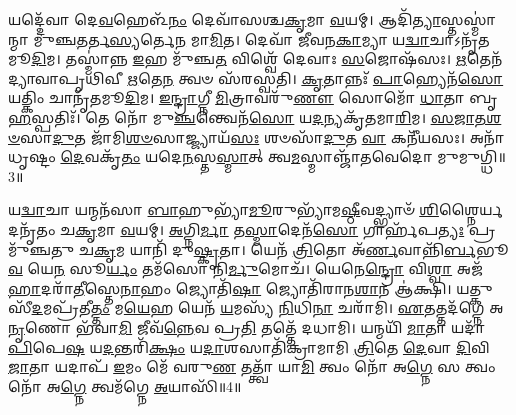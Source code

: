 𑌯𑌦𑍍𑌦𑍇᳴𑌵𑌾 𑌦𑍇\-\ul{𑌵}\-𑌹𑍇𑌳᳴\-\ul{𑌨𑌂} 𑌦𑍇𑌵𑌾᳴𑌸𑌶𑍍𑌚\-\ul{𑌕𑍃}\-𑌮𑌾 \ul{𑌵}\-𑌯𑌮𑍍। 
𑌆𑌦𑌿᳴\-\ul{𑌤𑍍𑌯𑌾}\-𑌸𑍍𑌤𑌸𑍍𑌮𑌾॑𑌨𑍍𑌮𑌾 𑌮𑍁𑌞𑍍𑌚\-\ul{𑌤}\-𑌰𑍍𑌤\-\ul{𑌸𑍍𑌯}\-𑌰𑍍𑌤𑍇\-\ul{𑌨} 𑌮𑌾\-\ul{𑌮𑌿}\-𑌤। 
𑌦𑍇𑌵𑌾᳴ 𑌜𑍀𑌵𑌨\-\ul{𑌕𑌾}\-𑌮𑍍𑌯𑌾 𑌯\-\ul{𑌦𑍍𑌵𑌾}\-𑌚𑌾𑌽𑌨𑍃᳴𑌤\-𑌮𑍂\-\ul{𑌦𑌿}\-𑌮। 
𑌤𑌸𑍍𑌮𑌾॑𑌨𑍍𑌨 \ul{𑌇}\-𑌹 𑌮𑍁᳴𑌞𑍍𑌚\-\ul{𑌤} 𑌵𑌿𑌶𑍍𑌵𑍇᳴ 𑌦𑍇𑌵𑌾𑌃 \ul{𑌸}\-𑌜𑍋𑌷᳴𑌸𑌃। 
\-\ul{𑌋}\-𑌤𑍇𑌨᳴ 𑌦𑍍𑌯𑌾𑌵𑌾𑌪𑍃𑌥𑌿𑌵𑍀 \ul{𑌋}\-𑌤𑍇\-\ul{𑌨} 𑌤𑍍𑌵𑍞 𑌸᳴𑌰𑌸𑍍𑌵𑌤𑌿। 
\-\ul{𑌕𑍃}\-𑌤𑌾𑌨𑍍𑌨𑌃᳴ \ul{𑌪𑌾}\-𑌹𑍍𑌯𑍇𑌨᳴\-\ul{𑌸𑍋} 𑌯𑌤𑍍𑌕𑌿𑌂 𑌚𑌾𑌨𑍃᳴𑌤\-𑌮𑍂\-\ul{𑌦𑌿}\-𑌮। 
\-\ul{𑌇}\-\-\ul{𑌨𑍍𑌦𑍍𑌰𑌾}\-𑌗𑍍𑌨𑍀 \ul{𑌮𑌿}\-𑌤𑍍𑌰𑌾𑌵𑌰𑍁᳴\-\ul{𑌣𑍗} 𑌸𑍋𑌮𑍋᳴ \ul{𑌧𑌾}\-𑌤𑌾 𑌬𑍃\-\ul{𑌹}\-𑌸𑍍𑌪𑌤𑌿𑌃᳴। 
𑌤𑍇 𑌨𑍋᳴ 𑌮𑍁\-\ul{𑌞𑍍𑌚}\-𑌨𑍍𑌤𑍍𑌵𑍇𑌨᳴\-\ul{𑌸𑍋} 𑌯\-\ul{𑌦}\-𑌨𑍍𑌯𑌕𑍃᳴𑌤𑌮𑌾\-\ul{𑌰𑌿}\-𑌮। 
\-\ul{𑌸}\-\-\ul{𑌜𑌾}\-\-\ul{𑌤}\-\-\ul{𑌶}\-\-\ul{𑍞}\-𑌸𑌾\-\ul{𑌦𑍁}\-𑌤 𑌜𑌾᳴𑌮𑌿\-\ul{𑌶}\-\-\ul{𑍞}\-𑌸𑌾𑌜𑍍𑌜𑍍𑌯𑌾𑌯᳴\-\ul{𑌸𑌃} 𑌶𑍞𑌸𑌾᳴\-\ul{𑌦𑍁}\-𑌤 \ul{𑌵𑌾} 𑌕𑌨𑍀᳴𑌯𑌸𑌃। 
𑌅𑌨𑌾᳴𑌧𑍃𑌷𑍍𑌟𑌂 \ul{𑌦𑍇}\-𑌵𑌕𑍃᳴\-\ul{𑌤𑌂} 𑌯𑌦𑍇\-\ul{𑌨}\-𑌸𑍍𑌤\-\ul{𑌸𑍍𑌮𑌾}\-𑌤𑍍 𑌤𑍍𑌵\-\ul{𑌮}\-𑌸𑍍𑌮𑌾𑌞𑍍𑌜𑌾᳴𑌤𑌵𑍇𑌦𑍋 𑌮𑍁𑌮𑍁𑌗𑍍𑌧𑌿॥3॥

𑌯\-\ul{𑌦𑍍𑌵𑌾}\-𑌚𑌾 𑌯𑌨𑍍𑌮𑌨᳴𑌸𑌾 \ul{𑌬𑌾}\-𑌹𑍁𑌭𑍍𑌯𑌾᳴\-\ul{𑌮𑍂}\-𑌰𑍁𑌭𑍍𑌯𑌾᳴𑌮\-\ul{𑌷𑍍𑌠𑍀}\-𑌵𑌦𑍍𑌭𑍍𑌯𑌾𑍞᳴ \ul{𑌶𑌿}\-𑌶𑍍𑌨𑍈𑌰𑍍𑌯𑌦𑌨𑍃᳴𑌤𑌂 𑌚\-\ul{𑌕𑍃}\-𑌮𑌾 \ul{𑌵}\-𑌯𑌮𑍍। 
\-\ul{𑌅}\-𑌗𑍍𑌨𑌿\-\ul{𑌰𑍍𑌮𑌾} 𑌤\-\ul{𑌸𑍍𑌮𑌾}\-𑌦𑍇𑌨᳴\-\ul{𑌸𑍋} 𑌗𑌾𑌰𑍍\mbox{}𑌹᳴𑌪\-\ul{𑌤𑍍𑌯𑌃} 𑌪𑍍𑌰𑌮𑍁᳴𑌞𑍍𑌚𑌤𑍁 𑌚\-\ul{𑌕𑍃}\-𑌮 𑌯𑌾𑌨𑌿᳴ 𑌦𑍁\-\ul{𑌷𑍍𑌕𑍃}\-𑌤𑌾। 
𑌯𑍇𑌨᳴ \ul{𑌤𑍍𑌰𑌿}\-𑌤𑍋 𑌅᳴\-\ul{𑌰𑍍𑌣}\-𑌵𑌾𑌨𑍍𑌨𑌿᳴\-\ul{𑌰𑍍𑌬}\-𑌭𑍂\-\ul{𑌵} 𑌯𑍇\-\ul{𑌨} 𑌸𑍂\-\ul{𑌰𑍍𑌯𑌂} 𑌤𑌮᳴𑌸𑍋 𑌨𑌿\-\ul{𑌰𑍍𑌮𑍁}\-𑌮𑍋𑌚᳴। 
𑌯𑍇𑌨𑍇\-\ul{𑌨𑍍𑌦𑍍𑌰𑍋} 𑌵𑌿\-\ul{𑌶𑍍𑌵𑌾} 𑌅𑌜᳴\-\ul{𑌹𑌾}\-𑌦𑌰𑌾᳴\-\ul{𑌤𑍀}\-𑌸𑍍𑌤𑍇\-\ul{𑌨𑌾}\-𑌹𑌂 𑌜𑍍𑌯𑍋𑌤𑌿᳴\-\ul{𑌷𑌾} 𑌜𑍍𑌯𑍋𑌤𑌿᳴𑌰𑌾𑌨\-\ul{𑌶𑌾}\-𑌨 𑌆॑𑌕𑍍𑌷𑌿। 
𑌯𑌤𑍍𑌕𑍁𑌸𑍀᳴\-\ul{𑌦}\-𑌮𑌪𑍍𑌰᳴𑌤𑍀\-\ul{𑌤𑍍𑌤𑌂} 𑌮\-\ul{𑌯𑍇}\-𑌹 𑌯𑍇𑌨᳴ \ul{𑌯}\-𑌮𑌸𑍍𑌯᳴ \ul{𑌨𑌿}\-𑌧𑌿\-\ul{𑌨𑌾} 𑌚𑌰𑌾᳴𑌮𑌿। 
\-\ul{𑌏}\-𑌤𑌤𑍍𑌤𑌦᳴𑌗𑍍𑌨𑍇 𑌅\-\ul{𑌨𑍃}\-𑌣𑍋 𑌭᳴𑌵𑌾\-\ul{𑌮𑌿} 𑌜𑍀𑌵᳴\-\ul{𑌨𑍍𑌨𑍇}\-𑌵 𑌪𑍍𑌰\-\ul{𑌤𑌿} 𑌤𑌤𑍍𑌤𑍇᳴ 𑌦𑌧𑌾𑌮𑌿। 
𑌯𑌨𑍍𑌮𑌯𑌿᳴ \ul{𑌮𑌾}\-𑌤𑌾 𑌯𑌦𑌾᳴ \ul{𑌪𑌿}\-𑌪𑍇\-\ul{𑌷} 𑌯\-\ul{𑌦}\-𑌨𑍍𑌤𑌰𑌿᳴\-\ul{𑌕𑍍𑌷𑌂} 𑌯\-\ul{𑌦𑌾}\-𑌶𑌸𑌾𑌤𑌿᳴𑌕𑍍𑌰𑌾𑌮𑌾𑌮𑌿 \ul{𑌤𑍍𑌰𑌿}\-𑌤𑍇 \ul{𑌦𑍇}\-𑌵𑌾 \ul{𑌦𑌿}\-𑌵𑌿 \ul{𑌜𑌾}\-𑌤𑌾 𑌯𑌦𑌾𑌪᳴ \ul{𑌇}\-𑌮𑌂 𑌮𑍇᳴ 𑌵𑌰𑍁\-\ul{𑌣} 𑌤𑌤𑍍𑌤𑍍𑌵𑌾᳴ 𑌯𑌾\-\ul{𑌮𑌿} 𑌤𑍍𑌵𑌂 𑌨𑍋᳴ 𑌅\-\ul{𑌗𑍍𑌨𑍇} 𑌸 𑌤𑍍𑌵𑌂 𑌨𑍋᳴ 𑌅\-\ul{𑌗𑍍𑌨𑍇} 𑌤𑍍𑌵𑌮᳴𑌗𑍍𑌨𑍇 \ul{𑌅}\-𑌯𑌾𑌸𑌿᳴॥4॥\anuvakamend


